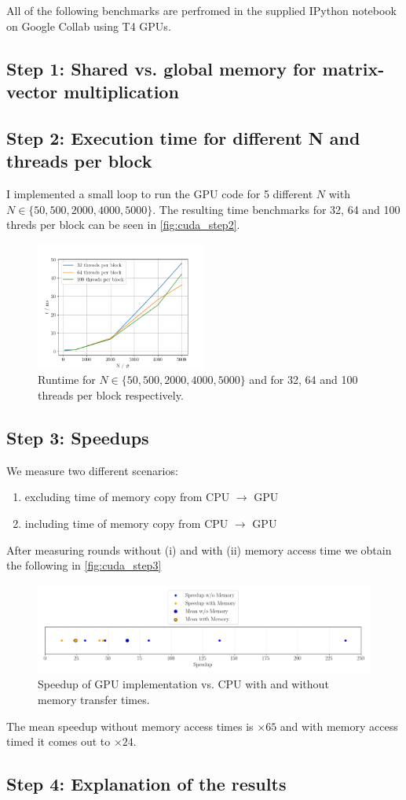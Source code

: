 All of the following benchmarks are perfromed in the supplied IPython notebook on Google Collab using T4 GPUs. 

\subsection{Step 1: Shared vs. global memory for matrix-vector multiplication}
\subsection{Step 2: Execution time for different N and threads per block}
I implemented a small loop to run the GPU code for 5 different $N$ with $N \in \{50, 500, 2000, 4000, 5000\}$. The resulting time benchmarks for 32, 64 and 100 threds per block can be seen in \autoref{fig:cuda_step2}. 
\begin{figure}[H]
    \centering
    \includegraphics[width=0.5\textwidth]{../fig/lab3/step2.png}
    \caption{Runtime for $N \in \{50, 500, 2000, 4000, 5000\}$ and for 32, 64 and 100 threads per block respectively.}
    \label{fig:cuda_step2}
\end{figure}
\subsection{Step 3: Speedups}
We measure two different scenarios: 
\begin{enumerate}[i]
    \item excluding time of memory copy from CPU $\rightarrow$ GPU
    \item including time of memory copy from CPU $\rightarrow$ GPU
\end{enumerate}
After measuring  rounds without (i) and with (ii) memory access time we obtain the following  in \autoref{fig:cuda_step3}
\begin{figure}[H]
    \centering
    \includegraphics[width=\textwidth]{../fig/lab3/step3.png}
    \caption{Speedup of GPU implementation vs. CPU with and without memory transfer times.}
    \label{fig:cuda_step3}
\end{figure}
The mean speedup without memory access times is $\times 65$ and with memory access timed it comes out to $\times 24$.
\subsection{Step 4: Explanation of the results}

